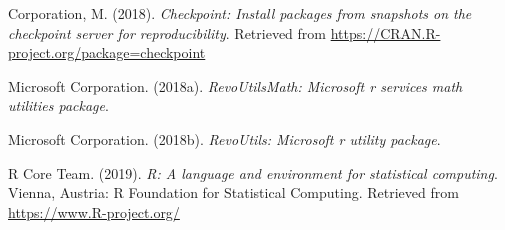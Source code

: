 \documentclass[man,floatsintext]{apa6}
\begin{document}
\leavevmode\hypertarget{ref-R-checkpoint}{}%
Corporation, M. (2018). \emph{Checkpoint: Install packages from snapshots on the checkpoint server for reproducibility}. Retrieved from \url{https://CRAN.R-project.org/package=checkpoint}

\leavevmode\hypertarget{ref-R-RevoUtilsMath}{}%
Microsoft Corporation. (2018a). \emph{RevoUtilsMath: Microsoft r services math utilities package}.

\leavevmode\hypertarget{ref-R-RevoUtils}{}%
Microsoft Corporation. (2018b). \emph{RevoUtils: Microsoft r utility package}.

\leavevmode\hypertarget{ref-R-base}{}%
R Core Team. (2019). \emph{R: A language and environment for statistical computing}. Vienna, Austria: R Foundation for Statistical Computing. Retrieved from \url{https://www.R-project.org/}

\endgroup
\end{document}
